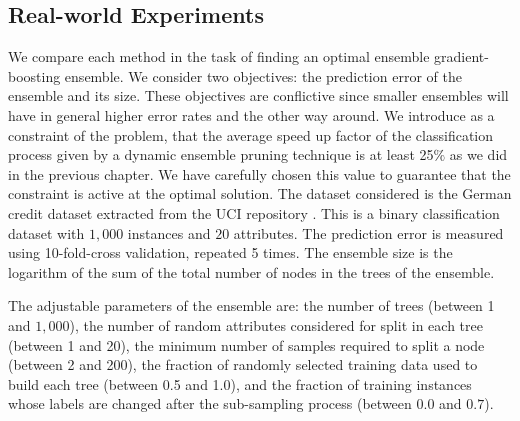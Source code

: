 \subsection{Real-world Experiments}

We compare each method in the task of finding an optimal ensemble 
gradient-boosting ensemble. We consider two objectives: the prediction error of the
ensemble and its size. These objectives are conflictive since smaller ensembles 
will have in general higher error rates and the other way around. 
We introduce as a constraint of the problem, 
that the average speed up factor of the classification process given by a dynamic 
ensemble pruning technique  is at least 25$\%$ as we did in the previous chapter. We 
have carefully chosen this value to guarantee that the constraint is active at 
the optimal solution. The dataset considered is the German credit dataset extracted 
from the UCI repository \citep{Dua2019}. This is a binary classification dataset with $1,000$ 
instances and $20$ attributes. The prediction error is measured using 10-fold-cross validation, 
repeated 5 times. The ensemble size is the logarithm of the 
sum of the total number of nodes in the trees of the ensemble.

The adjustable parameters of the ensemble are: the number of trees 
(between 1 and $1,000$), the number of random attributes considered for split in 
each tree (between 1 and 20), the minimum number of samples required to split a node (between 2 and
200), the fraction of randomly selected training data used to build each tree (between 0.5 and 1.0),
and the fraction of training instances whose labels are changed after the sub-sampling process
(between $0.0$ and $0.7$).

